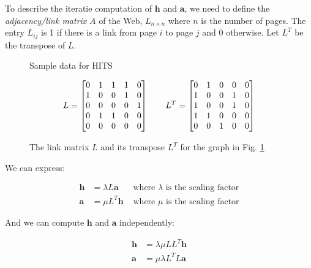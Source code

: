 To describe the iteratie computation of $\mathbf{h}$ and $\mathbf{a}$, we need to define the \textit{adjacency/link matrix} $A$ of the Web, $L_{n \times n}$ where $n$ is the number of pages. The entry $L_{ij}$ is 1 if there is a link from page $i$ to page $j$ and 0 otherwise. Let $L^T$ be the transpose of $L$. 

\begin{figure}[H]
\centering
\scalebox{1}{
    
}
\caption{Sample data for HITS}
\label{fig:HITS}
\end{figure}

\begin{figure}[H]
\begin{equation*}
\centering
    L =
    \begin{bmatrix}
        0 & 1 & 1 & 1 & 0 \\
        1 & 0 & 0 & 1 & 0 \\
        0 & 0 & 0 & 0 & 1 \\
        0 & 1 & 1 & 0 & 0 \\
        0 & 0 & 0 & 0 & 0 \\
    \end{bmatrix}
    \qquad
    L^T =
    \begin{bmatrix}
        0 & 1 & 0 & 0 & 0 \\
        1 & 0 & 0 & 1 & 0 \\
        1 & 0 & 0 & 1 & 0 \\
        1 & 1 & 0 & 0 & 0 \\
        0 & 0 & 1 & 0 & 0 \\
    \end{bmatrix}
\end{equation*}
\caption{The link matrix $L$ and its transpose $L^T$ for the graph in Fig. \ref{fig:HITS}}
\end{figure}

We can express:

\begin{align*}
    \mathbf{h} & = \lambda L \mathbf{a} & \text{ where } \lambda \text{ is the scaling factor} \\
    \mathbf{a} & = \mu L^T \mathbf{h} & \text{ where } \mu \text{ is the scaling factor}
\end{align*}

And we can compute $\mathbf{h}$ and $\mathbf{a}$ independently:

\begin{align*}
    \mathbf{h} & = \lambda \mu L L^T \mathbf{h} \\
    \mathbf{a} & = \mu \lambda L^T L \mathbf{a}
\end{align*}

